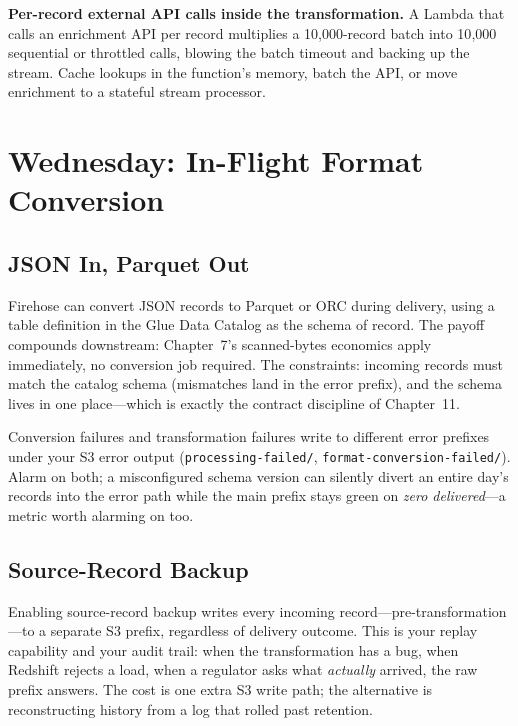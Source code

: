 \begin{pitfall}
\textbf{Per-record external API calls inside the transformation.} A Lambda that calls an enrichment API per record multiplies a 10{,}000-record batch into 10{,}000 sequential or throttled calls, blowing the batch timeout and backing up the stream. Cache lookups in the function's memory, batch the API, or move enrichment to a stateful stream processor.
\end{pitfall}

\section{Wednesday: In-Flight Format Conversion}
\subsection{JSON In, Parquet Out}
Firehose can convert JSON records to Parquet or ORC during delivery, using a table definition in the Glue Data Catalog as the schema of record. The payoff compounds downstream: Chapter~7's scanned-bytes economics apply immediately, no conversion job required. The constraints: incoming records must match the catalog schema (mismatches land in the error prefix), and the schema lives in one place---which is exactly the contract discipline of Chapter~11.

\begin{notebox}
Conversion failures and transformation failures write to different error prefixes under your S3 error output (\texttt{processing-failed/}, \texttt{format-conversion-failed/}). Alarm on both; a misconfigured schema version can silently divert an entire day's records into the error path while the main prefix stays green on \emph{zero delivered}---a metric worth alarming on too.
\end{notebox}

\subsection{Source-Record Backup}
Enabling source-record backup writes every incoming record---pre-transformation---to a separate S3 prefix, regardless of delivery outcome. This is your replay capability and your audit trail: when the transformation has a bug, when Redshift rejects a load, when a regulator asks what \emph{actually} arrived, the raw prefix answers. The cost is one extra S3 write path; the alternative is reconstructing history from a log that rolled past retention.

